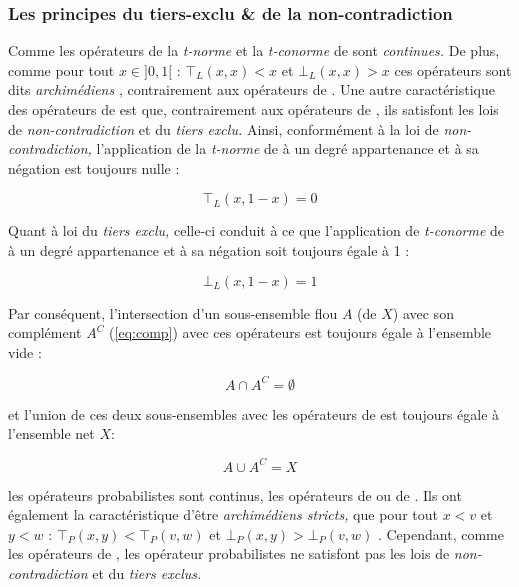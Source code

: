 \subsubsection{Les principes du tiers-exclu \& de la non-contradiction}

Comme les opérateurs de \textcite{Zadeh1965} la \emph{t-norme} et la
\emph{t-conorme} de  sont \emph{continues.} De plus,
comme pour tout \(x \in ]0,1[\) : \(⊤_L(x,x) < x\) et
\( ⊥_L(x,x) > x\) ces opérateurs sont dits \emph{archimédiens}
\autocite{Bouchon-Meunier1995}, contrairement aux opérateurs de
\textcite{Zadeh1965}. Une autre caractéristique des opérateurs de
 est que, contrairement aux opérateurs de
\textcite{Zadeh1965}, ils satisfont les lois de
\emph{non-contradiction} et du \emph{tiers exclu.} Ainsi, conformément
à la loi de \emph{non-contradiction,} l’application de la
\emph{t-norme} de  à un degré appartenance et à sa
négation est toujours nulle :

\begin{equation}
  ⊤_L(x,1-x) = 0
\end{equation}

Quant à loi du \emph{tiers exclu,} celle-ci conduit à ce que
l’application de \emph{t-conorme} de  à un degré
appartenance et à sa négation soit toujours égale à 1 :

\begin{equation}
  ⊥_L(x,1-x) = 1
\end{equation}

Par conséquent, l'intersection d'un sous-ensemble flou \(A\) (de
\(X\)) avec son complément \(A^C\) (\autoref{eq:comp}) avec ces
opérateurs est toujours égale à l'ensemble vide :

\begin{equation}
  A \cap A^C = \emptyset
\end{equation}

et l'union de ces deux sous-ensembles avec les opérateurs de
 est toujours égale à l'ensemble net \(X\):

\begin{equation}
  A \cup A^C = X
\end{equation}


les opérateurs probabilistes
sont continus, les opérateurs de \textcite{Zadeh1965} ou de
. Ils ont également la caractéristique d'être
\emph{archimédiens stricts,} \ie que pour tout \(x < v\) et \(y < w\)
: \(⊤_P(x,y) < ⊤_P(v,w)\) et \(⊥_P(x,y) > ⊥_P(v,w)\)
\autocite{Bouchon-Meunier1995}. Cependant, comme les opérateurs de
\textcite{Zadeh1965}, les opérateur probabilistes ne satisfont pas les
lois de \emph{non-contradiction} et du \emph{tiers exclus.}


